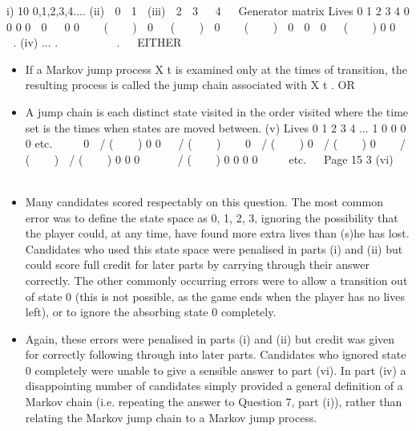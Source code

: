 \documentclass[a4paper,12pt]{article}
\begin{document}
i)
10
{0,1,2,3,4....}
(ii)

0

1

(iii)

2

3


4


Generator matrix
Lives
0
1
2
3
4
0
0
0
0
 0


0
0
   (    )
 0

 (    )

0


 (    )

0
 0
 0

 (    )
0
0
 
 .
(iv)
...
. 







.  
EITHER
\begin{itemize}
\item If a Markov jump process X t is examined only at the times of transition, the
resulting process is called the jump chain associated with X t .
OR
\item 
A jump chain is each distinct state visited in the order visited where the time
set is the times when states are moved between.
(v)
Lives
0
1
2
3
4
...
1
0
0
0
0
etc. 



0
 / (    )
0
0
  / (    )



0
 / (    )
0
 / (    )
0


 / (    )
 / (    )
0
0
0




 / (    )
0
0
0
0
 
 
etc.


Page 15 %
3
(vi)
  


  
\item Many candidates scored respectably on this question. The most common error was to define the state space as {0, 1, 2, 3}, ignoring the possibility that the player could, at any time, have found more extra lives than (s)he has lost. Candidates who used this state space were
penalised in parts (i) and (ii) but could score full credit for later parts by carrying through their answer correctly. The other commonly occurring errors were to allow a transition out of state 0 (this is not possible, as the game ends when the player has no lives left), or to
ignore the absorbing state 0 completely.
\item Again, these errors were penalised in parts (i) and (ii) but credit was given for correctly following through into later parts. Candidates who ignored state 0 completely were unable to give a sensible answer to part (vi). In part (iv) a
disappointing number of candidates simply provided a general definition of a Markov chain (i.e. repeating the answer to Question 7, part (i)), rather than relating the Markov jump chain
to a Markov jump process.
\end{itemize}
\end{document}
